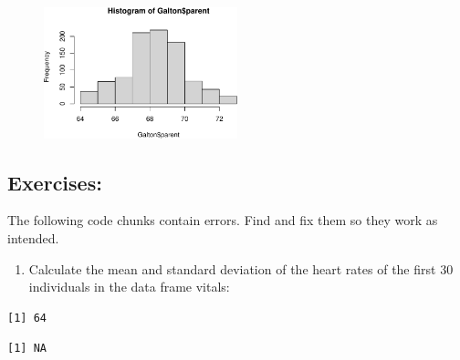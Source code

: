 \documentclass[
  letterpaper,
  DIV=11,
  numbers=noendperiod]{scrreprt}
\newenvironment{Shaded}{\begin{snugshade}}{\end{snugshade}}
\newcommand{\DecValTok}[1]{\textcolor[rgb]{0.68,0.00,0.00}{#1}}
\newcommand{\FunctionTok}[1]{\textcolor[rgb]{0.28,0.35,0.67}{#1}}
\newcommand{\NormalTok}[1]{\textcolor[rgb]{0.00,0.23,0.31}{#1}}
\newcommand{\SpecialCharTok}[1]{\textcolor[rgb]{0.37,0.37,0.37}{#1}}
\providecommand{\tightlist}{%
  \setlength{\itemsep}{0pt}\setlength{\parskip}{0pt}}\usepackage{longtable,booktabs,array}
\begin{document}
\begin{figure}[H]

{\centering \includegraphics[width=0.5\textwidth,height=\textheight]{./descriptive_files/figure-pdf/unnamed-chunk-4-2.pdf}

}

\end{figure}

\hypertarget{exercises-9}{%
\subsection{Exercises:}\label{exercises-9}}

The following code chunks contain errors. Find and fix them so they work
as intended.

\begin{enumerate}
\def\labelenumi{\arabic{enumi}.}
\tightlist
\item
  Calculate the mean and standard deviation of the heart rates of the
  first 30 individuals in the data frame vitals:
\end{enumerate}

\begin{Shaded}
\end{Shaded}

\begin{verbatim}
[1] 64
\end{verbatim}

\begin{Shaded}
\end{Shaded}

\begin{verbatim}
[1] NA
\end{verbatim}
\end{document}
